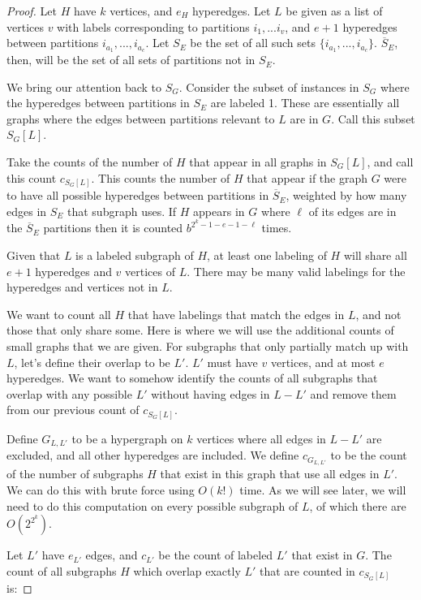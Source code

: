 \documentclass[11pt,letterpaper,pdftex]{article}
\begin{document}
\lemmaInclusion*
\begin{proof}
Let $H$ have $k$ vertices, and $e_H$ hyperedges. Let $L$ be given as a list of vertices $v$ with labels corresponding to partitions $i_1,...i_v$, and $e+1$ hyperedges between partitions $i_{a_1},..., i_{a_c}$. Let $S_E$ be the set of all such sets $\{i_{a_1},...,i_{a_c}\}$. $\overline{S}_E$, then, will be the set of all sets of partitions not in $S_E$.

We bring our attention back to $S_G$. Consider the subset of instances in $S_G$ where the hyperedges between partitions in $S_E$ are labeled 1. These are essentially all graphs where the edges between partitions relevant to $L$ are in $G$. Call this subset $S_G[L]$.

Take the counts of the number of $H$ that appear in all graphs in $S_G[L]$, and call this count $c_{S_G[L]}$. This counts the number of $H$ that appear if the graph $G$ were to have all possible hyperedges between partitions in $\overline{S}_E$, weighted by how many edges in $S_E$ that subgraph uses. If $H$ appears in $G$ where $\ell$ of its edges are in the $\overline{S}_E$ partitions then it is counted $b^{2^k - 1 - e - 1 - \ell}$ times. 

Given that $L$ is a labeled subgraph of $H$, at least one labeling of $H$ will share all $e+1$ hyperedges and $v$ vertices of $L$. There may be many valid labelings for the hyperedges and vertices not in $L$.

We want to count all $H$ that have labelings that match the edges in $L$, and not those that only share some. Here is where we will use the additional counts of small graphs that we are given. For subgraphs that only partially match up with $L$, let's define their overlap to be $L'$. $L'$ must have $v$ vertices, and at most $e$ hyperedges. We want to somehow identify the counts of all subgraphs that overlap with any possible $L'$ without having edges in $L-L'$ and remove them from our previous count of $c_{S_G[L]}$.

Define $G_{L,L'}$ to be a hypergraph on $k$ vertices where all edges in $L-L'$ are excluded, and all other hyperedges are included. We define $c_{G_{L,L'}}$ to be the count of the number of subgraphs $H$ that exist in this graph that use all edges in $L'$. We can do this with brute force using $O(k!)$ time. As we will see later, we will need to do this computation on every possible subgraph of $L$, of which there are $O(2^{2^k })$.

Let $L'$ have $e_{L'}$ edges, and $c_{L'}$ be the count of labeled $L'$ that exist in $G$. The count of all subgraphs $H$ which overlap exactly $L'$ that are counted in $c_{S_G[L]}$ is:


\end{proof}
\end{document}
